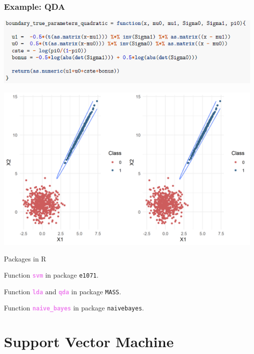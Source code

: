 \documentclass[9pt]{beamer}
\begin{document}
\begin{frame}
\frametitle{Example: QDA }
\begin{center}
\includegraphics[width=0.8\linewidth]{./boundary_qda}
\end{center}
\begin{center}
\hspace*{-.05\textwidth}\includegraphics[height=.65\textheight]{qda_plot}
\end{center}
\end{frame}


\begin{frame}{Packages in R}

Function \textcolor{violet}{{\bf \texttt{svm}}} in package \texttt{e1071}.

\vspace{.5cm}

Function \textcolor{violet}{{\bf \texttt{lda}}} and \textcolor{violet}{{\bf \texttt{qda}}} in package \texttt{MASS}.

\vspace{.5cm}

Function \textcolor{violet}{{\bf \texttt{naive\_bayes}}} in package \texttt{naivebayes}.

\end{frame}

\section{Support Vector Machine}
\end{document}
